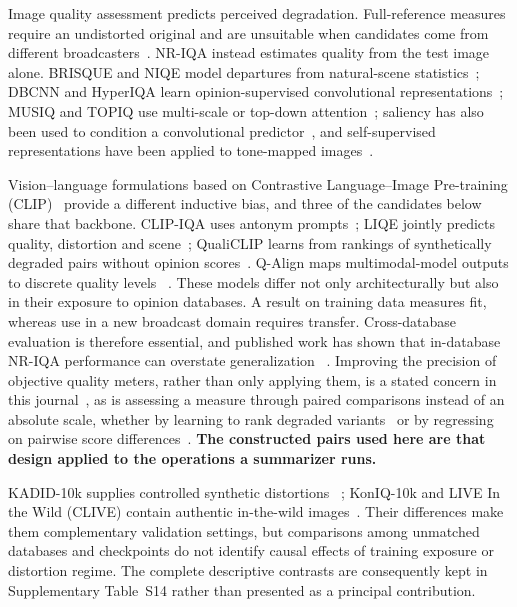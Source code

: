 Image quality assessment predicts perceived degradation. Full-reference
measures require an undistorted original and are unsuitable when candidates come
from different broadcasters~\citep{wang2004ssim,zhai2020iqa_survey}. NR-IQA
instead estimates quality from the test image alone. BRISQUE and NIQE model
departures from natural-scene statistics~\citep{mittal2012brisque,
mittal2013niqe}; DBCNN and HyperIQA learn opinion-supervised convolutional
representations~\citep{zhang2020dbcnn,su2020hyperiqa}; MUSIQ and TOPIQ use
multi-scale or top-down attention~\citep{ke2021musiq,chen2024topiq}; saliency has
also been used to condition a convolutional predictor~\citep{jia2018saliency}, and
self-supervised representations have been applied to tone-mapped
images~\citep{pinto2026tonemapped}.

Vision--language formulations based on Contrastive Language--Image Pre-training
(CLIP)~\citep{radford2021clip} provide a different inductive bias, and three of the
candidates below share that backbone. CLIP-IQA uses
antonym prompts~\citep{wang2023clipiqa}; LIQE jointly predicts quality,
distortion and scene~\citep{zhang2023liqe}; QualiCLIP learns from rankings of
synthetically degraded pairs without opinion scores~\citep{agnolucci2024qualiclip}.
Q-Align maps multimodal-model outputs to discrete quality levels
~\citep{wu2024qalign}. These models differ not only architecturally but also in
their exposure to opinion databases. A result on training data measures fit,
whereas use in a new broadcast domain requires transfer. Cross-database
evaluation is therefore essential, and published work has shown that
in-database NR-IQA performance can overstate generalization
~\citep{pinson2023nrbroadcast,cao2024datacentric}. Improving the precision of objective
quality meters, rather than only applying them, is a stated concern in this
journal~\citep{behzadpour2023precision}, as is assessing a measure through paired
comparisons instead of an absolute scale, whether by learning to rank degraded
variants~\citep{isogawa2019inpainted} or by regressing on pairwise score
differences~\citep{oszust2017lasso}. \textbf{The constructed pairs used here are that
design applied to the operations a summarizer runs.}

KADID-10k supplies controlled synthetic distortions
~\citep{lin2019kadid}; KonIQ-10k and LIVE In the Wild (CLIVE) contain authentic
in-the-wild images~\citep{hosu2020koniq,ghadiyaram2016clive}. Their differences
make them complementary validation settings, but comparisons among unmatched
databases and checkpoints do not identify causal effects of training exposure
or distortion regime. The complete descriptive contrasts are consequently kept
in Supplementary Table~S14 rather than presented as a principal contribution.

